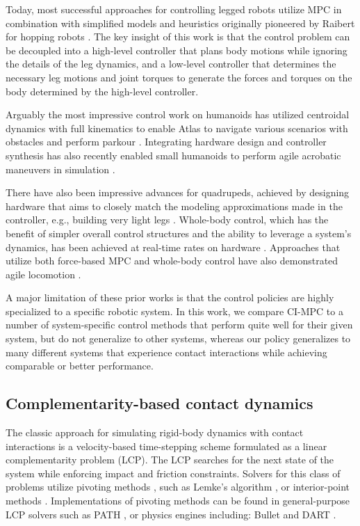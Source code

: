 Today, most successful approaches for controlling legged robots utilize MPC in combination with simplified models and heuristics originally pioneered by Raibert for hopping robots \cite{raibert1989dynamically}. The key insight of this work is that the control problem can be decoupled into a high-level controller that plans body motions while ignoring the details of the leg dynamics, and a low-level controller that determines the necessary leg motions and joint torques to generate the forces and torques on the body determined by the high-level controller.

Arguably the most impressive control work on humanoids has utilized centroidal dynamics with full kinematics to enable Atlas to navigate various scenarios with obstacles \cite{dai2014whole} and perform parkour \cite{atlas2019parkour}. Integrating hardware design and controller synthesis has also recently enabled small humanoids to perform agile acrobatic maneuvers in simulation \cite{chignoli2021humanoid}.

There have also been impressive advances for quadrupeds, achieved by designing hardware that aims to closely match the modeling approximations made in the controller, e.g., building very light legs \cite{bledt2020regularized}. Whole-body control, which has the benefit of simpler overall control structures and the ability to leverage a system's dynamics, has been achieved at real-time rates on hardware \cite{neunert2018whole}. Approaches that utilize both force-based MPC and whole-body control have also demonstrated agile locomotion \cite{kim2019highly}.

A major limitation of these prior works is that the control policies are highly specialized to a specific robotic system. In this work, we compare CI-MPC to a number of system-specific control methods that perform quite well for their given system, but do not generalize to other systems, whereas our policy generalizes to many different systems that experience contact interactions while achieving comparable or better performance.

\subsection{Complementarity-based contact dynamics}
The classic approach for simulating rigid-body dynamics with contact interactions is a velocity-based time-stepping scheme formulated as a linear complementarity problem (LCP). The LCP searches for the next state of the system while enforcing impact and friction constraints. Solvers for this class of problems utilize pivoting methods 
\cite{drumwright2015rapidly}, such as Lemke's algorithm \cite{cottle2009linear}, or interior-point methods \cite{kojima1991unified}. Implementations of pivoting methods can be found in general-purpose LCP solvers such as PATH \cite{dirkse1995path}, or physics engines including: Bullet \cite{coumans2019} and DART \cite{lee2018dart}. 

